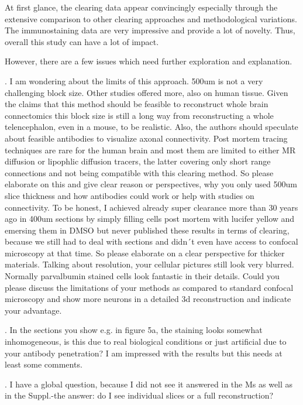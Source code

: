 \documentclass{article}
\begin{document}
\noindent At first glance, the clearing data appear convincingly especially through the extensive comparison to other clearing approaches and methodological variations. The immunostaining data are very impressive and provide a lot of novelty. Thus, overall this study can have a lot of impact.

\noindent However, there are a few issues which need further exploration and explanation.

. I am wondering about the limits of this approach. 500um is not a very challenging block size. Other studies offered more, also on human tissue. Given the claims that this method should be feasible to reconstruct whole brain connectomics this block size is still a long way from reconstructing a whole telencephalon, even in a mouse, to be realistic. Also, the authors should speculate about feasible antibodies to visualize axonal connectivity. Post mortem tracing techniques are rare for the human brain and most them are limited to either MR diffusion or lipophlic diffusion tracers, the latter covering only short range connections and not being compatible with this clearing method. So please elaborate on this and give clear reason or perspectives, why you only used 500um slice thickness and how antibodies could work or help with studies on connectivity. To be honest, I achieved already super clearance more than 30 years ago in 400um sections by simply filling cells post mortem with lucifer yellow and emersing them in DMSO but never published these results in terms of clearing, because we still had to deal with sections and didn´t even have access to confocal microscopy at that time. So please elaborate on a clear perspective for thicker materials. Talking about resolution, your cellular pictures still look very blurred. Normally parvalbumin stained cells look fantastic in their details. Could you please discuss the limitations of your methods as compared to standard confocal microscopy and show more neurons in a detailed 3d reconstruction and indicate your advantage.

. In the sections you show e.g. in figure 5a, the staining looks somewhat inhomogeneous, is this due to real biological conditions or just artificial due to your antibody penetration? I am impressed with the results but this needs at least some comments.

. I have a global question, because I did not see it answered in the Ms as well as in the Suppl.-the answer: do I see individual slices or a full reconstruction?
\end{document}
